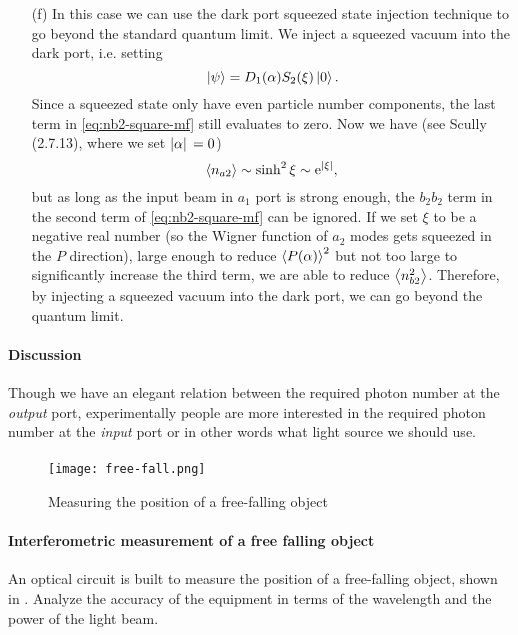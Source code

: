 \documentclass[hyperref, a4paper]{article}
\newcommand*{\ee}{\mathrm{e}}
\begin{document}
\begin{itemize}
    \item[(f)] In this case we can use the dark port squeezed state injection technique to go beyond the 
    standard quantum limit. We inject a squeezed vacuum into the dark port, i.e. setting 
    \begin{equation}
        \ket*{\psi} = D_1(\alpha) S_2(\xi) \ket*{0}.
    \end{equation}
    Since a squeezed state only have even particle number components, the last term in \eqref{eq:nb2-square-mf} 
    still evaluates to zero. Now we have (see Scully (2.7.13), where we set $\abs*{\alpha} = 0$)
    \[
        \expval{n_{a2}} \sim \sinh^2 \xi \sim \ee^{\abs*{\xi}},
    \]
    but as long as the input beam in $a_1$ port is strong enough, the $b_2 b_2$ term in the second term of 
    \eqref{eq:nb2-square-mf} can be ignored. If we set $\xi$ to be a negative real number (so the Wigner function
    of $a_2$ modes gets squeezed in the $P$ direction), large enough to reduce $\expval{P(\alpha)}^2$ but not
    too large to significantly increase the third term, we are able to reduce $\expval{n_{b2}^2}$.
    Therefore, by injecting a squeezed vacuum into the dark port, we can go beyond the quantum limit.
\end{itemize}

\paragraph{Discussion} Though we have an elegant relation between the required photon number at the \emph{output} port, 
experimentally people are more interested in the required photon number at the \emph{input} port or in other words what light source we should use.

\paragraph{}

\begin{figure}
    \centering
    \texttt{[image: free-fall.png]}
    \caption{Measuring the position of a free-falling object}
    \label{fig:free-fall}
\end{figure}

\paragraph{Interferometric measurement of a free falling object} An optical circuit is built to measure the position of a free-falling object, shown in .
Analyze the accuracy of the equipment in terms of the wavelength and the power of the light beam.
\end{document}
